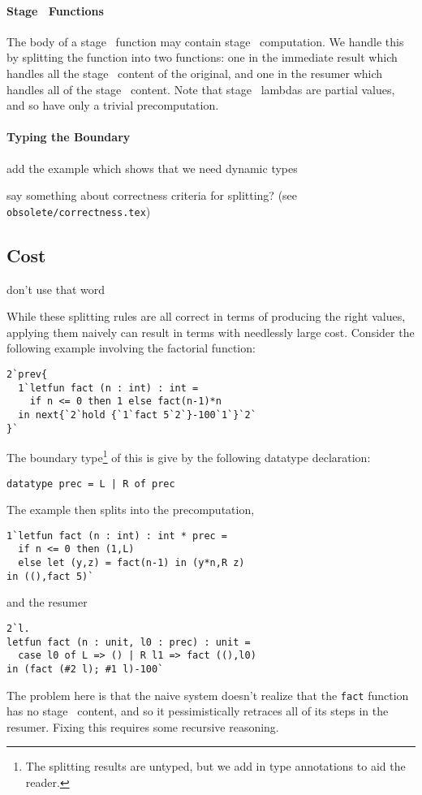 \paragraph {Stage \bbone\ Functions}

The body of a stage \bbone\ function may contain stage \bbtwo\ computation. We
handle this by splitting the function into two functions: one in the immediate
result which handles all the stage \bbone\ content of the original, and one in
the resumer which handles all of the stage \bbtwo\ content. Note that stage
\bbone\ lambdas are partial values, and so have only a trivial precomputation.

\paragraph {Typing the Boundary}

\TODO add the example which shows that we need dynamic types



\TODO say something about correctness criteria for splitting? (see
\texttt{obsolete/correctness.tex})

\subsection{Cost}

\TODO don't use that word

While these splitting rules are all correct in terms of producing the right values, applying them naively can result in terms with needlessly large cost.  Consider the following example involving the factorial function:
\begin{lstlisting}
2`prev{
  1`letfun fact (n : int) : int = 
    if n <= 0 then 1 else fact(n-1)*n
  in next{`2`hold {`1`fact 5`2`}-100`1`}`2`
}`
\end{lstlisting}

The boundary type\footnote{The splitting results are untyped, but we add in type annotations to aid the reader.} of this is give by the following datatype declaration:
\begin{lstlisting}
datatype prec = L | R of prec
\end{lstlisting}
The example then splits into the precomputation,
\begin{lstlisting}
1`letfun fact (n : int) : int * prec = 
  if n <= 0 then (1,L) 
  else let (y,z) = fact(n-1) in (y*n,R z)
in ((),fact 5)`
\end{lstlisting}
and the resumer
\begin{lstlisting}
2`l.
letfun fact (n : unit, l0 : prec) : unit = 
  case l0 of L => () | R l1 => fact ((),l0)
in (fact (#2 l); #1 l)-100`
\end{lstlisting}
The problem here is that the naive system doesn't realize that the \texttt{fact} function has no stage \bbtwo\ content,
and so it pessimistically retraces all of its steps in the resumer.  
Fixing this requires some recursive reasoning.  

